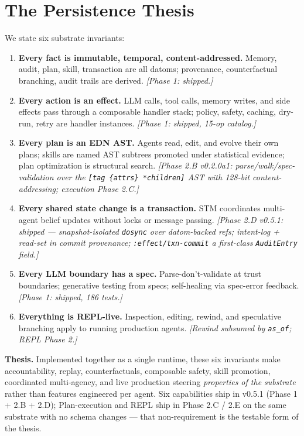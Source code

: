 \documentclass[anon]{nesy2026}   %
\newcommand{\C}[1]{\texttt{#1}}
\begin{document}
\section{The Persistence Thesis}\label{sec:thesis}

We state six substrate invariants:

\begin{enumerate}
\item \textbf{Every fact is immutable, temporal, content-addressed.} Memory, audit, plan, skill, transaction are all datoms; provenance, counterfactual branching, audit trails are derived. \emph{[Phase 1: shipped.]}
\item \textbf{Every action is an effect.} LLM calls, tool calls, memory writes, and side effects pass through a composable handler stack; policy, safety, caching, dry-run, retry are handler instances. \emph{[Phase 1: shipped, 15-op catalog.]}
\item \textbf{Every plan is an EDN AST.} Agents read, edit, and evolve their own plans; skills are named AST subtrees promoted under statistical evidence; plan optimization is structural search. \emph{[Phase 2.B v0.2.0a1: parse/walk/spec-validation over the \C{[tag \{attrs\} *children]} AST with 128-bit content-addressing; execution Phase 2.C.]}
\item \textbf{Every shared state change is a transaction.} STM coordinates multi-agent belief updates without locks or message passing. \emph{[Phase 2.D v0.5.1: shipped --- snapshot-isolated \C{dosync} over datom-backed refs; intent-log + read-set in commit provenance; \C{:effect/txn-commit} a first-class \C{AuditEntry} field.]}
\item \textbf{Every LLM boundary has a spec.} Parse-don't-validate at trust boundaries; generative testing from specs; self-healing via spec-error feedback. \emph{[Phase 1: shipped, 186 tests.]}
\item \textbf{Everything is REPL-live.} Inspection, editing, rewind, and speculative branching apply to running production agents. \emph{[Rewind subsumed by \C{as\_of}; REPL Phase 2.]}
\end{enumerate}

\textbf{Thesis.} Implemented together as a single runtime, these six invariants make accountability, replay, counterfactuals, composable safety, skill promotion, coordinated multi-agency, and live production steering \emph{properties of the substrate} rather than features engineered per agent. Six capabilities ship in v0.5.1 (Phase 1 + 2.B + 2.D); Plan-execution and REPL ship in Phase 2.C / 2.E on the same substrate with no schema changes --- that non-requirement is the testable form of the thesis.
\end{document}

